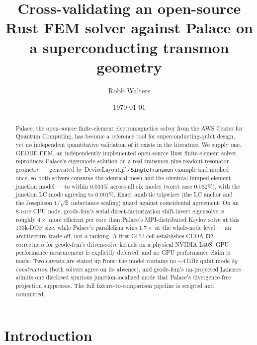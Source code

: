 \documentclass{anvil-paper}
\title{Cross-validating an open-source Rust FEM solver against Palace on a
superconducting transmon geometry}
\author{Robb Walters}
\date{\today}
\begin{document}
\maketitle

\begin{abstract}
Palace, the open-source finite-element electromagnetics solver from the AWS
Center for Quantum Computing, has become a reference tool for
superconducting-qubit design, yet no independent quantitative validation of
it exists in the literature. We supply one. GEODE-FEM, an independently
implemented open-source Rust finite-element solver, reproduces Palace's
eigenmode solution on a real transmon-plus-readout-resonator geometry ---
generated by DeviceLayout.jl's \texttt{SingleTransmon} example and meshed
once, so both solvers consume the identical mesh and the identical
lumped-element junction model --- to within $0.033\%$ across all six modes
(worst case $0.032\%$), with the junction LC mode agreeing to $0.001\%$.
Exact analytic tripwires (the LC anchor and the Josephson $1/\sqrt{2}$
inductance scaling) guard against coincidental agreement. On an 8-core CPU
node, geode-fem's serial direct-factorization shift-invert eigensolve is
roughly $4\times$ more efficient per core than Palace's MPI-distributed
Krylov solve at this 133k-DOF size, while Palace's parallelism wins
$1.7\times$ at the whole-node level --- an architecture trade-off, not a
ranking. A first GPU cell establishes CUDA-f32 correctness for geode-fem's
driven-solve kernels on a physical NVIDIA L40S; GPU performance measurement
is explicitly deferred, and no GPU performance claim is made. Two caveats
are stated up front: the model contains no ${\sim}4$\,GHz qubit mode
\emph{by construction} (both solvers agree on its absence), and geode-fem's
un-projected Lanczos admits one disclosed spurious junction-localized mode
that Palace's divergence-free projection suppresses. The full
fixture-to-comparison pipeline is scripted and committed.
\end{abstract}

\section{Introduction}
\label{sec:intro}
\end{document}
